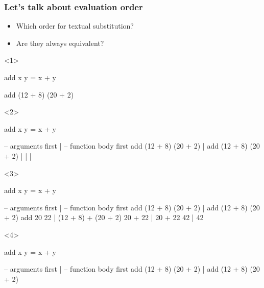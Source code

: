 \documentclass[17pt]{beamer}
\renewcommand{\(}[1]{\begin{columns}[#1]}
\renewcommand{\)}{\end{columns}}
\newcommand{\<}[1]{\begin{column}{#1}}
\renewcommand{\>}{\end{column}}
\begin{document}
\begin{frame}[fragile]
  \frametitle{Let's talk about evaluation order}
  \begin{minipage}[t][.2\textheight]{\textwidth}
    \begin{itemize}
      \item<1-> Which order for textual substitution?
      \item<4-> Are they always equivalent?
  \end{itemize}
  \end{minipage}
  \begin{minipage}[c][.5\textheight]{\textwidth}
  \begin{center}
    \begin{onlyenv}<1>
      \begin{code}
add x y = x + y
      \end{code}
      \begin{code}[eval]
add (12 + 8) (20 + 2)
      \end{code}
    \end{onlyenv}
    \begin{onlyenv}<2>
      \begin{code}
add x y = x + y
      \end{code}
      \begin{code}[eval]
-- arguments first          | -- function body first
add (12 + 8) (20 + 2)       | add (12 + 8) (20 + 2)
                            |
                            |
                            |
      \end{code}
    \end{onlyenv}
    \begin{onlyenv}<3>
      \begin{code}
add x y = x + y
      \end{code}
      \begin{code}[eval]
-- arguments first          | -- function body first
add (12 + 8) (20 + 2)       | add (12 + 8) (20 + 2)
add 20 22                   | (12 + 8) + (20 + 2)
20 + 22                     | 20 + 22
42                          | 42
      \end{code}
    \end{onlyenv}
    \begin{onlyenv}<4>
      \begin{code}
add x y = x + y
      \end{code}
      \begin{code}[eval]
-- arguments first          | -- function body first
add (12 + 8) (20 + 2)       | add (12 + 8) (20 + 2)

\end{code}
\end{onlyenv}
\end{center}
\end{minipage}
\end{frame}
\end{document}

